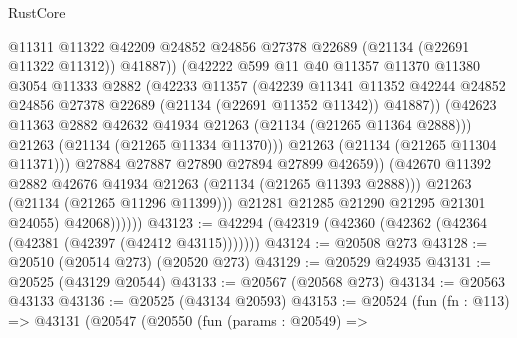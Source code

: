 \begin{lexlean}{RustCore}
\begin{coremodule}
                              @11311
                              @11322
                              @42209
                              @24852
                              @24856
                              @27378
                              @22689
                              (@21134 (@22691 @11322 @11312))
                              @41887))
                          (@42222
                            @599
                            @11
                            @40
                            @11357
                            @11370
                            @11380
                            @3054
                            @11333
                            @2882
                            (@42233
                              @11357
                              (@42239
                                @11341
                                @11352
                                @42244
                                @24852
                                @24856
                                @27378
                                @22689
                                (@21134 (@22691 @11352 @11342))
                                @41887))
                            (@42623
                              @11363
                              @2882
                              @42632
                              @41934
                              @21263
                              (@21134 (@21265 @11364 @2888)))
                            @21263
                            (@21134 (@21265 @11334 @11370)))
                          @21263
                          (@21134 (@21265 @11304 @11371)))
                        @27884
                        @27887
                        @27890
                        @27894
                        @27899
                        @42659))
                    (@42670 @11392 @2882 @42676 @41934 @21263 (@21134 (@21265 @11393 @2888)))
                    @21263
                    (@21134 (@21265 @11296 @11399)))
                  @21281
                  @21285
                  @21290
                  @21295
                  @21301
                  @24055)
                @42068))))))
@43123 := @42294 (@42319 (@42360 (@42362 (@42364 (@42381 (@42397 (@42412 @43115)))))))
@43124 := @20508 @273
@43128 := @20510 (@20514 @273) (@20520 @273)
@43129 := @20529 @24935
@43131 := @20525 (@43129 @20544)
@43133 := @20567 (@20568 @273)
@43134 := @20563 @43133
@43136 := @20525 (@43134 @20593)
@43153 := @20524
    (fun (fn : @113) =>
    @43131
      (@20547
        (@20550
          (fun (params : @20549) =>

\end{coremodule}
\end{lexlean}
